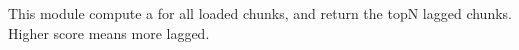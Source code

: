 This module compute a  for all loaded chunks, and return the topN lagged chunks.
Higher score means more lagged.

